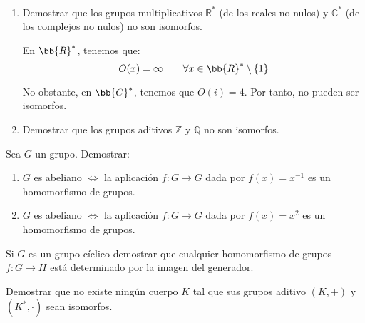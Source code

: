 \begin{ejercicio}\label{ej:2.36}~
    \begin{enumerate}
        \item Demostrar que los grupos multiplicativos $\mathbb{R}^{\ast}$ (de los reales no nulos) y $\mathbb{C}^{\ast}$ (de los complejos no nulos) no son isomorfos.
        
        En $\bb{R}^*$, tenemos que:
        \begin{equation*}
            O(x)=\infty\qquad \forall x\in \bb{R}^*\setminus\{1\}
        \end{equation*}

        No obstante, en $\bb{C}^*$, tenemos que $O(i)=4$. Por tanto, no pueden ser isomorfos.
        \item Demostrar que los grupos aditivos $\mathbb{Z}$ y $\mathbb{Q}$ no son isomorfos.
    \end{enumerate}
\end{ejercicio}

\begin{ejercicio}\label{ej:2.37}
    Sea $G$ un grupo. Demostrar:
    \begin{enumerate}
        \item $G$ es abeliano $\iff$ la aplicación $f : G \to G$ dada por $f(x) = x^{-1}$ es un homomorfismo de grupos.
        \item $G$ es abeliano $\iff$ la aplicación $f : G \to G$ dada por $f(x) = x^2$ es un homomorfismo de grupos.
    \end{enumerate}
\end{ejercicio}


\begin{ejercicio}\label{ej:2.38}
    Si $G$ es un grupo cíclico demostrar que cualquier homomorfismo de grupos $f : G \to H$ está determinado por la imagen del generador.
\end{ejercicio}

\begin{ejercicio}\label{ej:2.39}
    Demostrar que no existe ningún cuerpo $K$ tal que sus grupos aditivo $(K, +)$ y $(K^{\ast}, \cdot)$ sean isomorfos.
\end{ejercicio}